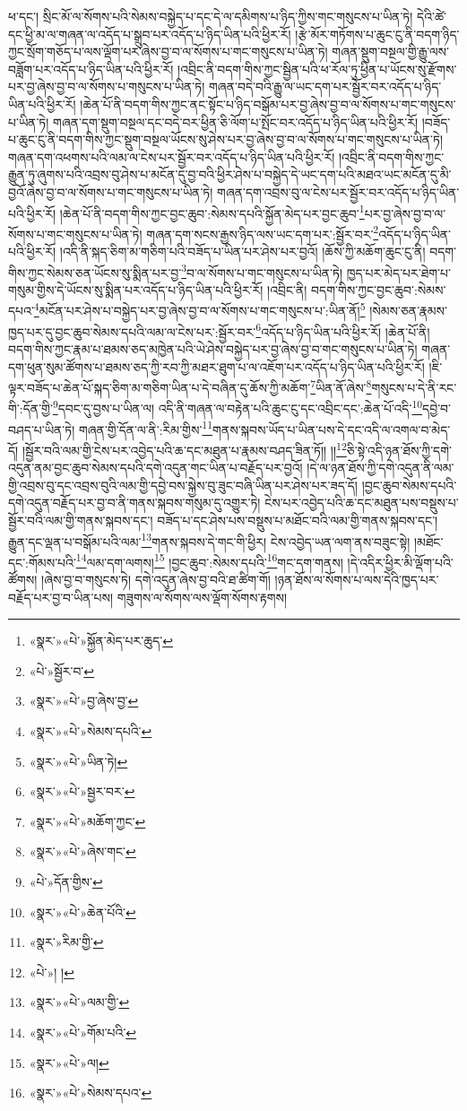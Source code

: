 ཕ་དང་། སྲིང་མོ་ལ་སོགས་པའི་སེམས་བསྐྱེད་པ་དང་དེ་ལ་དམིགས་པ་ཉིད་ཀྱིས་གང་གསུངས་པ་ཡིན་ཏེ། དེའི་ཚེ་དང་ཕྱི་མ་ལ་གཞན་ལ་འདོད་པ་སྒྲུབ་པར་འདོད་པ་ཉིད་ཡིན་པའི་ཕྱིར་རོ། །རྩེ་མོར་གཏོགས་པ་ཆུང་ངུ་ནི་བདག་ཉིད་ཀྱང་སྲོག་གཅོད་པ་ལས་ལྡོག་པར་ཞེས་བྱ་བ་ལ་སོགས་པ་གང་གསུངས་པ་ཡིན་ཏེ། གཞན་སྡུག་བསྔལ་གྱི་རྒྱུ་ལས་བཟློག་པར་འདོད་པ་ཉིད་ཡིན་པའི་ཕྱིར་རོ། །འབྲིང་ནི་བདག་གིས་ཀྱང་སྦྱིན་པའི་ཕ་རོལ་ཏུ་ཕྱིན་པ་ཡོངས་སུ་རྫོགས་པར་བྱ་ཞེས་བྱ་བ་ལ་སོགས་པ་གསུངས་པ་ཡིན་ཏེ། གཞན་བདེ་བའི་རྒྱུ་ལ་ཡང་དག་པར་སྦྱོར་བར་འདོད་པ་ཉིད་ཡིན་པའི་ཕྱིར་རོ། །ཆེན་པོ་ནི་བདག་གིས་ཀྱང་ནང་སྟོང་པ་ཉིད་བསྒོམ་པར་བྱ་ཞེས་བྱ་བ་ལ་སོགས་པ་གང་གསུངས་པ་ཡིན་ཏེ། གཞན་དག་སྡུག་བསྔལ་དང་བདེ་བར་ཕྱིན་ཅི་ལོག་པ་སྤོང་བར་འདོད་པ་ཉིད་ཡིན་པའི་ཕྱིར་རོ། །བཟོད་པ་ཆུང་ངུ་ནི་བདག་གིས་ཀྱང་སྡུག་བསྔལ་ཡོངས་སུ་ཤེས་པར་བྱ་ཞེས་བྱ་བ་ལ་སོགས་པ་གང་གསུངས་པ་ཡིན་ཏེ། གཞན་དག་འཕགས་པའི་ལམ་ལ་ངེས་པར་སྦྱོར་བར་འདོད་པ་ཉིད་ཡིན་པའི་ཕྱིར་རོ། །འབྲིང་ནི་བདག་གིས་ཀྱང་རྒྱུན་ཏུ་ཞུགས་པའི་འབྲས་བུ་ཤེས་པ་མངོན་དུ་བྱ་བའི་ཕྱིར་ཤེས་པ་བསྐྱེད་དེ་ཡང་དག་པའི་མཐའ་ཡང་མངོན་དུ་མི་བྱའོ་ཞེས་བྱ་བ་ལ་སོགས་པ་གང་གསུངས་པ་ཡིན་ཏེ། གཞན་དག་འབྲས་བུ་ལ་ངེས་པར་སྦྱོར་བར་འདོད་པ་ཉིད་ཡིན་པའི་ཕྱིར་རོ། །ཆེན་པོ་ནི་བདག་གིས་ཀྱང་བྱང་ཆུབ་:སེམས་དཔའི་སྐྱོན་མེད་པར་བྱང་ཆུབ་\footnote{«སྣར་»«པེ་»སྐྱོན་མེད་པར་ཆུད་}པར་བྱ་ཞེས་བྱ་བ་ལ་སོགས་པ་གང་གསུངས་པ་ཡིན་ཏེ། གཞན་དག་སངས་རྒྱས་ཉིད་ལས་ཡང་དག་པར་:སྦྱོར་བར་\footnote{«པེ་»སྦྱོར་བ་}འདོད་པ་ཉིད་ཡིན་པའི་ཕྱིར་རོ། །འདི་ནི་སྐད་ཅིག་མ་གཅིག་པའི་བཟོད་པ་ཡིན་པར་ཤེས་པར་བྱའོ། །ཆོས་ཀྱི་མཆོག་ཆུང་ངུ་ནི། བདག་གིས་ཀྱང་སེམས་ཅན་ཡོངས་སུ་སྨིན་པར་བྱ་\footnote{«སྣར་»«པེ་»བྱ་ཞེས་བྱ་}བ་ལ་སོགས་པ་གང་གསུངས་པ་ཡིན་ཏེ། ཁྱད་པར་མེད་པར་ཐེག་པ་གསུམ་གྱིས་དེ་ཡོངས་སུ་སྨིན་པར་འདོད་པ་ཉིད་ཡིན་པའི་ཕྱིར་རོ། །འབྲིང་ནི། བདག་གིས་ཀྱང་བྱང་ཆུབ་:སེམས་དཔའ་\footnote{«སྣར་»«པེ་»སེམས་དཔའི་}མངོན་པར་ཤེས་པ་བསྐྱེད་པར་བྱ་ཞེས་བྱ་བ་ལ་སོགས་པ་གང་གསུངས་པ་:ཡིན་ནོ།\footnote{«སྣར་»«པེ་»ཡིན་ཏེ།} །སེམས་ཅན་རྣམས་ཁྱད་པར་དུ་བྱང་ཆུབ་སེམས་དཔའི་ལམ་ལ་ངེས་པར་:སྦྱོར་བར་\footnote{«སྣར་»«པེ་»སྦྱར་བར་}འདོད་པ་ཉིད་ཡིན་པའི་ཕྱིར་རོ། །ཆེན་པོ་ནི། བདག་གིས་ཀྱང་རྣམ་པ་ཐམས་ཅད་མཁྱེན་པའི་ཡེ་ཤེས་བསྐྱེད་པར་བྱ་ཞེས་བྱ་བ་གང་གསུངས་པ་ཡིན་ཏེ། གཞན་དག་ཕུན་སུམ་ཚོགས་པ་ཐམས་ཅད་ཀྱི་རབ་ཀྱི་མཐར་ཐུག་པ་ལ་འཇོག་པར་འདོད་པ་ཉིད་ཡིན་པའི་ཕྱིར་རོ། །ཇི་ལྟར་བཟོད་པ་ཆེན་པོ་སྐད་ཅིག་མ་གཅིག་ཡིན་པ་དེ་བཞིན་དུ་ཆོས་ཀྱི་མཆོག་\footnote{«སྣར་»«པེ་»མཆོག་ཀྱང་}ཡིན་ནོ་ཞེས་\footnote{«སྣར་»«པེ་»ཞེས་གང་}གསུངས་པ་དེ་ནི་རང་གི་:དོན་གྱི་\footnote{«པེ་»དོན་གྱིས་}དབང་དུ་བྱས་པ་ཡིན་ལ། འདི་ནི་གཞན་ལ་བརྟེན་པའི་ཆུང་ངུ་དང་འབྲིང་དང་:ཆེན་པོ་འདི་\footnote{«སྣར་»«པེ་»ཆེན་པོའི་}དབྱེ་བ་བཤད་པ་ཡིན་ཏེ། གཞན་གྱི་དོན་ལ་ནི་:རིམ་གྱིས་\footnote{«སྣར་»རིམ་གྱི་}གནས་སྐབས་ཡོད་པ་ཡིན་པས་དེ་དང་འདི་ལ་འགལ་བ་མེད་དོ། །སྦྱོར་བའི་ལམ་གྱི་ངེས་པར་འབྱེད་པའི་ཆ་དང་མཐུན་པ་རྣམས་བཤད་ཟིན་ཏོ།། །།\footnote{«པེ་»། །}ཅི་སྟེ་འདི་ཉན་ཐོས་ཀྱི་དགེ་འདུན་ནམ་བྱང་ཆུབ་སེམས་དཔའི་དགེ་འདུན་གང་ཡིན་པ་བརྗོད་པར་བྱའོ། །དེ་ལ་ཉན་ཐོས་ཀྱི་དགེ་འདུན་ནི་ལམ་གྱི་འབྲས་བུ་དང་འབྲས་བུའི་ལམ་གྱི་དབྱེ་བས་སྐྱེས་བུ་ཟུང་བཞི་ཡིན་པར་ཤེས་པར་ཟད་དོ། །བྱང་ཆུབ་སེམས་དཔའི་དགེ་འདུན་བརྗོད་པར་བྱ་བ་ནི་གནས་སྐབས་གསུམ་དུ་འགྱུར་ཏེ། ངེས་པར་འབྱེད་པའི་ཆ་དང་མཐུན་པས་བསྡུས་པ་སྦྱོར་བའི་ལམ་གྱི་གནས་སྐབས་དང་། བཟོད་པ་དང་ཤེས་པས་བསྡུས་པ་མཐོང་བའི་ལམ་གྱི་གནས་སྐབས་དང་། རྒྱུན་དང་ལྡན་པ་བསྒོམ་པའི་ལམ་\footnote{«སྣར་»«པེ་»ལམ་གྱི་}གནས་སྐབས་དེ་གང་གི་ཕྱིར། ངེས་འབྱེད་ཡན་ལག་ནས་བཟུང་སྟེ། །མཐོང་དང་:གོམས་པའི་\footnote{«སྣར་»«པེ་»གོམ་པའི་}ལམ་དག་ལགས།\footnote{«སྣར་»«པེ་»ལ།} །བྱང་ཆུབ་:སེམས་དཔའི་\footnote{«སྣར་»«པེ་»སེམས་དཔའ་}གང་དག་གནས། །དེ་འདིར་ཕྱིར་མི་ལྡོག་པའི་ཚོགས། །ཞེས་བྱ་བ་གསུངས་ཏེ། དགེ་འདུན་ཞེས་བྱ་བའི་ཐ་ཚིག་གོ། །ཉན་ཐོས་ལ་སོགས་པ་ལས་དེའི་ཁྱད་པར་བརྗོད་པར་བྱ་བ་ཡིན་པས། གཟུགས་ལ་སོགས་ལས་ལྡོག་སོགས་རྟགས། 